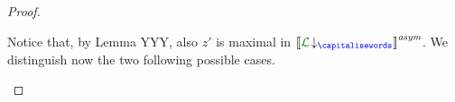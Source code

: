 \begin{proof}
\begin{description}
\begin{itemize}
 \end{itemize}  
 Notice that, by Lemma YYY, also $z'$ is maximal in $\asem{\proj{\clang}{}}$.
 We distinguish now the two following possible cases.\\
%
%
%
%
%
%

\end{description}
\end{proof}
